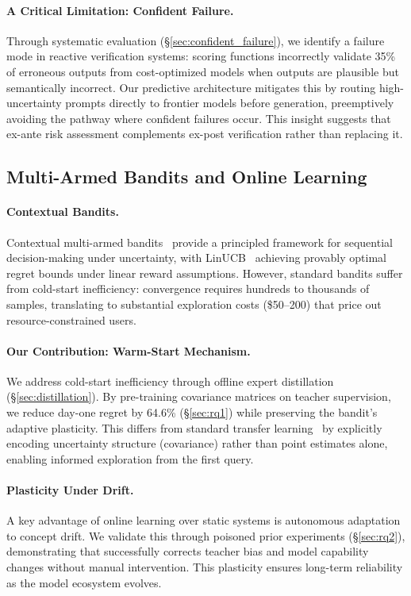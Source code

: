 \paragraph{A Critical Limitation: Confident Failure.} Through systematic evaluation (\S\ref{sec:confident_failure}), we identify a failure mode in reactive verification systems: scoring functions incorrectly validate 35\% of erroneous outputs from cost-optimized models when outputs are plausible but semantically incorrect. Our predictive architecture mitigates this by routing high-uncertainty prompts directly to frontier models before generation, preemptively avoiding the pathway where confident failures occur. This insight suggests that ex-ante risk assessment complements ex-post verification rather than replacing it.

\subsection{Multi-Armed Bandits and Online Learning}

\paragraph{Contextual Bandits.} Contextual multi-armed bandits~\cite{li2010contextual,chu2011contextual} provide a principled framework for sequential decision-making under uncertainty, with LinUCB~\cite{li2010contextual} achieving provably optimal regret bounds under linear reward assumptions. However, standard bandits suffer from cold-start inefficiency: convergence requires hundreds to thousands of samples, translating to substantial exploration costs (\$50--200) that price out resource-constrained users.

\paragraph{Our Contribution: Warm-Start Mechanism.} We address cold-start inefficiency through offline expert distillation (\S\ref{sec:distillation}). By pre-training covariance matrices on teacher supervision, we reduce day-one regret by 64.6\% (\S\ref{sec:rq1}) while preserving the bandit's adaptive plasticity. This differs from standard transfer learning~\cite{taylor2009transfer} by explicitly encoding uncertainty structure (covariance) rather than point estimates alone, enabling informed exploration from the first query.

\paragraph{Plasticity Under Drift.} A key advantage of online learning over static systems is autonomous adaptation to concept drift. We validate this through poisoned prior experiments (\S\ref{sec:rq2}), demonstrating that \ours{} successfully corrects teacher bias and model capability changes without manual intervention. This plasticity ensures long-term reliability as the model ecosystem evolves.

